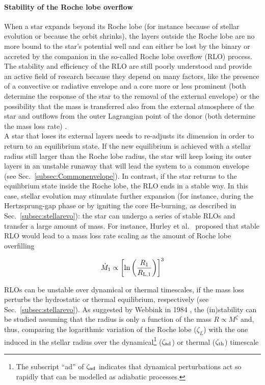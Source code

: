 \documentclass[a4paper,titlepage]{book}     	%
\newcommand{\mdot}{\ensuremath{\dot{M}}}
\newcommand{\rlone}{\ensuremath{R_\textup{L,1}}}
\begin{document}
\paragraph{Stability of the Roche lobe overflow} When a star expands beyond its Roche lobe (for instance because of stellar evolution or because the orbit shrinks), the layers outside the Roche lobe are no more bound to the star's potential well and can either be lost by the binary or accreted by the companion in the so-called Roche lobe overflow (RLO) process. The stability and efficiency of the RLO are still poorly understood and provide an active field of research because they depend on many factors, like the presence of a convective or radiative envelope and a core more or less prominent (both determine the response of the star to the removal of the external envelope) or the possibility that the mass is transferred also from the external atmosphere of the star and outflows from the outer Lagrangian point of the donor (both determine the mass loss rate) \cite{marchant2021_masstransferMESA}.\\

A star that loses its external layers needs to re-adjusts its dimension in order to return to an equilibrium state. If the new equilibrium is achieved with a stellar radius still larger than the Roche lobe radius, the star will keep losing its outer layers in an unstable runaway that will lead the system to a common envelope (see Sec.\ \ref{subsec:Commonenvelope}). In contrast, if the star returns to the equilibrium state inside the Roche lobe, the RLO ends in a stable way. In this case, stellar evolution may stimulate further expansion (for instance, during the Hertzsprung-gap phase or by igniting the core He-burning, as described in Sec.\ \ref{subsec:stellarevo}): the star can undergo a series of stable RLOs and transfer a large amount of mass. For instance, Hurley et al.\ \cite{Hurley2002} proposed that stable RLO would lead to a mass loss rate scaling as the amount of Roche lobe overfilling 

\begin{equation}\label{eq:masslostRoche}
    \mdot_1 \propto \left[ \ln \left(\frac{R_1}{\rlone} \right)\right]^3
\end{equation}

RLOs can be unstable over dynamical or thermal timescales, if the mass loss perturbs the hydrostatic or thermal equilibrium, respectively (see Sec.\ \ref{subsec:stellarevo}). As suggested by Webbink in 1984 \cite{Webbink1984_CE}, the (in)stability can be studied assuming that the radius is only a function of the mass $R\propto M^{\zeta}$ and, thus, comparing the logarithmic variation of the Roche lobe ($\zeta_L$) with the one induced in the stellar radius over the dynamical\footnote{The subscript ``ad'' of $\zeta_{\rm ad}$ indicates that dynamical perturbations act so rapidly that can be modelled as adiabatic processes.} ($\zeta_\textup{ad}$) or thermal ($\zeta_\textup{th}$) timescale
\end{document}

